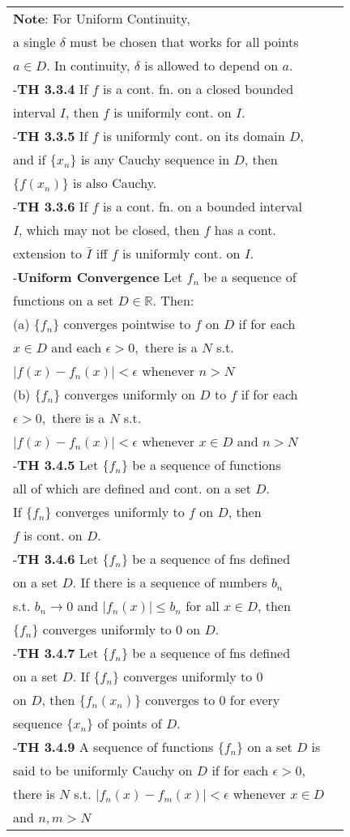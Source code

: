 \documentclass[10 pt,landscape]{article}
\begin{document}
\begin{multicols}{4}
\begin{tabular}{@{}ll@{}}
\textbf{Note}: For Uniform Continuity, \\ a single $\delta$ must be chosen that works for all points\\ $a\in D$. In continuity, $\delta$ is allowed to depend on $a$.\\
-\textbf{TH 3.3.4} If $f$ is a cont. fn. on a closed bounded \\interval $I$, then $f$ is uniformly cont. on $I$.\\
-\textbf{TH 3.3.5} If $f$ is uniformly cont. on its domain $D$,\\ and if $\{x_n\}$ is any Cauchy sequence in $D$, then \\$\{f(x_n)\}$ is also Cauchy.\\
-\textbf{TH 3.3.6} If $f$ is a cont. fn. on a bounded interval \\ $I$, which may not be closed, then $f$ has a cont. \\extension to $\bar{I}$ iff $f$ is uniformly cont. on $I$.\\
-\textbf{Uniform Convergence} Let $f_n$ be a sequence of\\ functions on a set $D \in \mathbb{R}$. Then: \\
(a) $\{f_n\}$ converges pointwise to $f$ on $D$ if for each \\$x \in D$ and each $\epsilon >0,$ there is a $N$ s.t.\\
$|f(x)-f_n(x)|< \epsilon $ whenever $ n>N$\\
(b) $\{f_n\}$ converges uniformly on $D$ to $f$ if for each \\$\epsilon >0,$ there is a $N$ s.t.\\
$|f(x)-f_n(x)|< \epsilon $ whenever $x\in D$ and $ n>N$\\
-\textbf{TH 3.4.5} Let $\{f_n\}$ be a sequence of functions\\ all of which are defined and cont. on a set $D$.\\ If $\{f_n\}$ converges uniformly to $f$ on $D$, then \\$f$ is cont. on $D$.\\
-\textbf{TH 3.4.6} Let $\{f_n\}$ be a sequence of fns defined\\ on a set $D$. If there is a sequence of numbers $b_n$\\ s.t. $b_n \rightarrow 0$ and $|f_n (x)| \leq b_n$ for all $x\in D$, then\\ $\{f_n\}$ converges uniformly to $0$ on $D$. \\
-\textbf{TH 3.4.7} Let $\{f_n\}$ be a sequence of fns defined\\ on a set $D$. If $\{f_n\}$ converges uniformly to 0 \\ on $D$, then $\{f_n(x_n)\}$ converges to 0 for every \\sequence $\{x_n\}$ of points of $D$.\\
-\textbf{TH 3.4.9} A sequence of functions $\{f_n\}$ on a set $D$ is\\ said to be  uniformly Cauchy on $D$ if for each $\epsilon >0,$ \\there is $N$ s.t. $|f_n(x)-f_m(x)| < \epsilon$ whenever $x \in D$ \\and $n,m>N$


\end{tabular}
\end{multicols}
\end{document}
